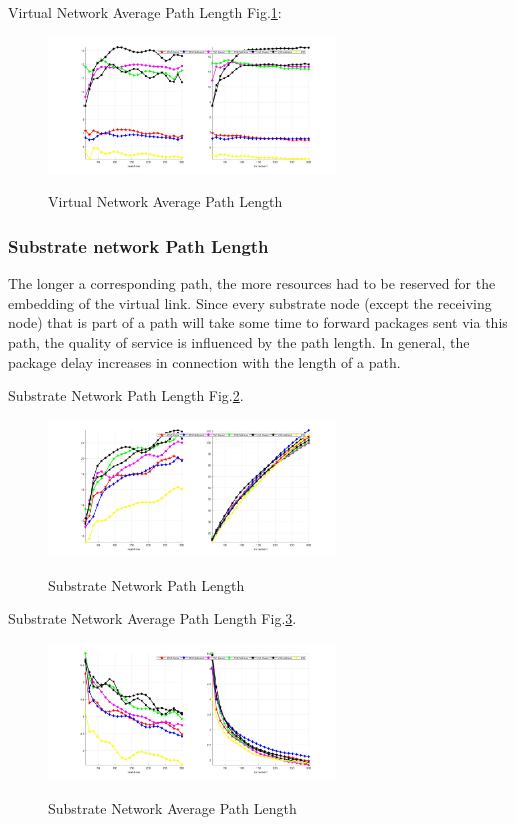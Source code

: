 Virtual Network Average Path Length Fig.\ref{fig:PathLengthAverageVirtualNetwork}:
\begin{figure}[htbp]
  \centering
  \includegraphics[width=3in]{Fig/PathLengthAverageVirtualNetwork}\\
  \caption{Virtual Network Average Path Length }\label{fig:PathLengthAverageVirtualNetwork}
\end{figure}

\subsubsection{Substrate network Path Length}
The longer a corresponding path, the more resources had to be reserved for the embedding of the virtual link. Since every substrate node (except the receiving node) that is part of a path will take some time to forward packages sent via this path, the quality of service is influenced by the path length. In general, the package delay increases in connection with the length of a path.

Substrate Network Path Length Fig.\ref{fig:PathLengthSubstrateNetwork}.
\begin{figure}[htbp]
  \centering
  \includegraphics[width=3in]{Fig/PathLengthSubstrateNetwork}\\
  \caption{ Substrate Network Path Length}\label{fig:PathLengthSubstrateNetwork}
\end{figure}

Substrate Network Average Path Length Fig.\ref{fig:PathLengthAverageSubstrateNetwork}.
\begin{figure}[htbp]
  \centering
  \includegraphics[width=3in]{Fig/PathLengthAverageSubstrateNetwork}\\
  \caption{ Substrate Network Average Path Length }\label{fig:PathLengthAverageSubstrateNetwork}
\end{figure}




